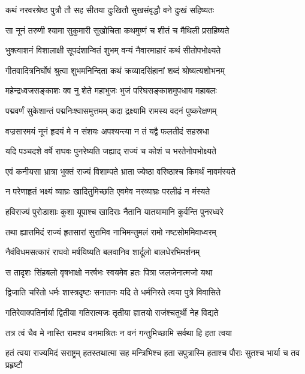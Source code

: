 \twolineshloka
{कथं नरवरश्रेष्ठ पुत्रौ तौ सह सीतया}
{दुःखितौ सुखसंवृद्धौ वने दुःखं सहिष्यतः} %

\twolineshloka
{सा नूनं तरुणी श्यामा सुकुमारी सुखोचिता}
{कथमुष्णं च शीतं च मैथिली प्रसहिष्यते} %

\twolineshloka
{भुक्त्वाशनं विशालाक्षी सूपदंशान्वितं शुभम्}
{वन्यं नैवारमाहारं कथं सीतोपभोक्ष्यते} %

\twolineshloka
{गीतवादित्रनिर्घोषं श्रुत्वा शुभमनिन्दिता}
{कथं क्रव्यादसिंहानां शब्दं श्रोष्यत्यशोभनम्} %

\twolineshloka
{महेन्द्रध्वजसङ्काशः क्व नु शेते महाभुजः}
{भुजं परिघसङ्काशमुपधाय महाबलः} %

\twolineshloka
{पद्मवर्णं सुकेशान्तं पद्मनिःश्वासमुत्तमम्}
{कदा द्रक्ष्यामि रामस्य वदनं पुष्करेक्षणम्} %

\twolineshloka
{वज्रसारमयं नूनं हृदयं मे न संशयः}
{अपश्यन्त्या न तं यद्वै फलतीदं सहस्रधा} %

\twolineshloka
{यदि पञ्चदशे वर्षे राघवः पुनरेष्यति}
{जह्याद् राज्यं च कोशं च भरतेनोपभोक्ष्यते} %

\twolineshloka
{एवं कनीयसा भ्रात्रा भुक्तं राज्यं विशाम्पते}
{भ्राता ज्येष्ठा वरिष्ठाश्च किमर्थं नावमंस्यते} %

\twolineshloka
{न परेणाहृतं भक्ष्यं व्याघ्रः खादितुमिच्छति}
{एवमेव नरव्याघ्रः परलीढं न मंस्यते} %

\twolineshloka
{हविराज्यं पुरोडाशाः कुशा यूपाश्च खादिराः}
{नैतानि यातयामानि कुर्वन्ति पुनरध्वरे} %

\twolineshloka
{तथा ह्यात्तमिदं राज्यं हृतसारां सुरामिव}
{नाभिमन्तुमलं रामो नष्टसोममिवाध्वरम्} %

\twolineshloka
{नैवंविधमसत्कारं राघवो मर्षयिष्यति}
{बलवानिव शार्दूलो बालधेरभिमर्शनम्} %

\twolineshloka
{स तादृशः सिंहबलो वृषभाक्षो नरर्षभः}
{स्वयमेव हतः पित्रा जलजेनात्मजो यथा} %

\twolineshloka
{द्विजाति चरितो धर्मः शास्त्रदृष्टः सनातनः}
{यदि ते धर्मनिरते त्वया पुत्रे विवासिते} %

\twolineshloka
{गतिरेवाक्पतिर्नार्या द्वितीया गतिरात्मजः}
{तृतीया ज्ञातयो राजंश्चतुर्थी नेह विद्यते} %

\twolineshloka
{तत्र त्वं चैव मे नास्ति रामश्च वनमाश्रितः}
{न वनं गन्तुमिच्छामि सर्वथा हि हता त्वया} %

\fourlineindentedshloka
{हतं त्वया राज्यमिदं सराष्ट्रम्}
{हतस्तथात्मा सह मन्त्रिभिश्च}
{हता सपुत्रास्मि हताश्च पौराः}
{सुतश्च भार्या च तव प्रहृष्टौ} %

